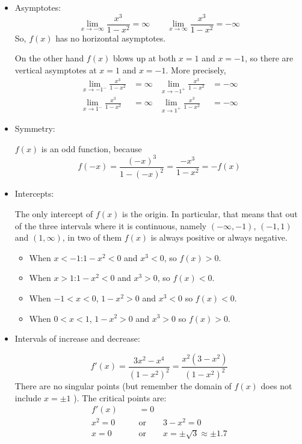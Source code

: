 \begin{solution}
\begin{itemize}
\item Asymptotes:
\[\lim_{x \to -\infty}\frac{x^3}{1-x^2}=\infty \qquad
\lim_{x \to \infty}\frac{x^3}{1-x^2}=-\infty \]
So, $f(x)$ has no horizontal asymptotes.

 On the other hand $f(x)$ blows up at both $x=1$
and $x=-1$, so there are vertical asymptotes at $x=1$ and $x=-1$.
More precisely,
\begin{align*}
\lim_{x \to -1^-}\frac{x^3}{1-x^2}&=\infty
&
\lim_{x \to -1^+}\frac{x^3}{1-x^2}&=-\infty\\
\lim_{x \to 1^-}\frac{x^3}{1-x^2}&=\infty
&
\lim_{x \to 1^+}\frac{x^3}{1-x^2}&=-\infty
\end{align*}

\item Symmetry:

$f(x)$ is an odd function, because
\[f(-x)=\frac{(-x)^3}{1-(-x)^2}=\frac{-x^3}{1-x^2}=-f(x)\]

\item Intercepts:

The only intercept of $f(x)$ is the origin. In particular, that means that out of the three intervals where it is continuous,
                  namely $(-\infty,-1)$, $(-1,1)$ and $(1,\infty)$, in two of them $f(x)$ is always positive or always negative.
\begin{itemize}
\item When $x<-1$:\quad $1-x^2<0$ and $x^3<0$, so $f(x)>0$.
\item When $x>1$:\qquad $1-x^2<0$ and $x^3>0$, so $f(x)<0$.
\item When $-1<x<0$, $1-x^2>0$ and $x^3<0$ so $f(x)<0$.
\item When $0<x<1$, $1-x^2>0$ and $x^3>0$ so $f(x)>0$.
\end{itemize}

\item Intervals of increase and decrease:

\[f'(x)=\dfrac{3x^2-x^4}{(1-x^2)^2}=\frac{x^2(3-x^2)}{(1-x^2)^2}\]
There are no singular points (but remember the domain of $f(x)$ does not include $x=\pm 1$ ). The critical points are:
\begin{align*}
f'(x)&=0\\
x^2=0\qquad&\mbox{or}\qquad 3-x^2=0\\
x=0\qquad&\mbox{or}\qquad x=\pm\sqrt{3}\approx\pm 1.7
\end{align*}


\end{itemize}
\end{solution}
